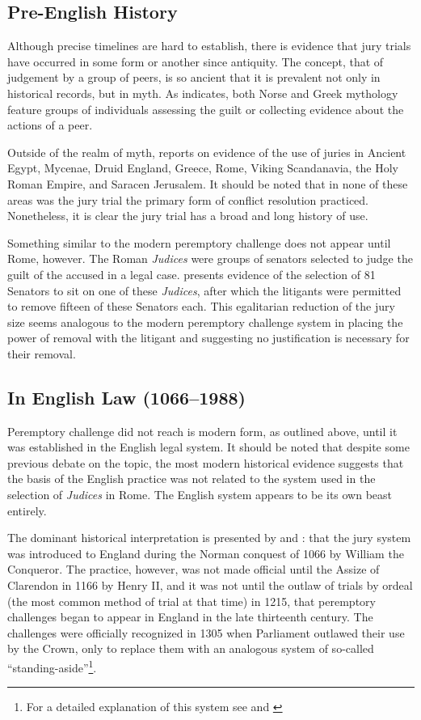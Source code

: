 \subsection{Pre-English History}

Although precise timelines are hard to establish, there is evidence that jury trials have occurred in some form or another since
antiquity. The concept, that of judgement by a group of peers, is so ancient that it is prevalent not only in historical records,
but in myth. As \cite{hoffman1997} indicates, both Norse and Greek mythology feature groups of individuals assessing the guilt or
collecting evidence about the actions of a peer.

Outside of the realm of myth, \cite{hoffman1997} reports on evidence of the use of juries in Ancient Egypt, Mycenae, Druid
England, Greece, Rome, Viking Scandanavia, the Holy Roman Empire, and Saracen Jerusalem. It should be noted that in none of these
areas was the jury trial the primary form of conflict resolution practiced. Nonetheless, it is clear the jury trial has a broad
and long history of use.

Something similar to the modern peremptory challenge does not appear until Rome, however. The Roman \textit{Judices} were groups
of senators selected to judge the guilt of the accused in a legal case. \cite{hoffman1997} presents evidence of the selection of
81 Senators to sit on one of these \textit{Judices}, after which the litigants were permitted to remove fifteen of these Senators
each. This egalitarian reduction of the jury size seems analogous to the modern peremptory challenge system in placing the power
of removal with the litigant and suggesting no justification is necessary for their removal.

\subsection{In English Law (1066--1988)}

Peremptory challenge did not reach is modern form, as outlined above, until it was established in the English legal system. It
should be noted that despite some previous debate on the topic, the most modern historical evidence suggests that the basis of the
English practice was not related to the system used in the selection of \textit{Judices} in Rome. The English system appears to be
its own beast entirely.

The dominant historical interpretation is presented by \cite{vonmosch1921} and \cite{hoffman1997}: that the jury system was
introduced to England during the Norman conquest of 1066 by William the Conqueror. The practice, however, was not made official
until the Assize of Clarendon in 1166 by Henry II, and it was not until the outlaw of trials by ordeal (the most common method of
trial at that time) in 1215, that peremptory challenges began to appear in England in the late thirteenth century. The challenges
were officially recognized in 1305 when Parliament outlawed their use by the Crown, only to replace them with an analogous system
of so-called ``standing-aside''\footnote{For a detailed explanation of this system see \cite{hoffman1997} and \cite{brown2000}}. 

